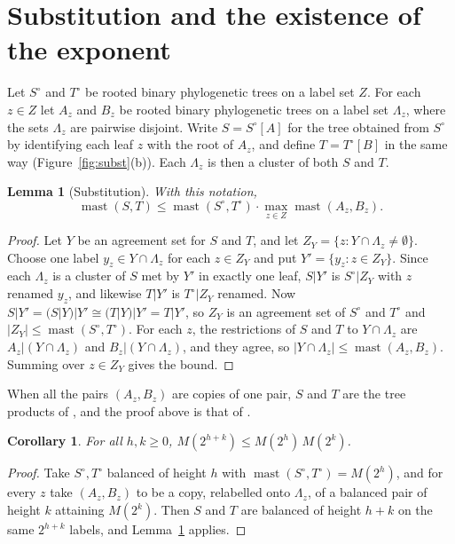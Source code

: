 \documentclass[11pt]{amsart}
\newtheorem{lemma}[theorem]{Lemma}
\newtheorem{corollary}[theorem]{Corollary}
\theoremstyle{definition}
\newcommand{\mast}{\operatorname{mast}}
\begin{document}
\section{Substitution and the existence of the exponent}\label{sec:subst}

Let $S^\circ$ and $T^\circ$ be rooted binary phylogenetic trees on a label set $Z$. For each
$z\in Z$ let $A_z$ and $B_z$ be rooted binary phylogenetic trees on a label set $\Lambda_z$,
where the sets $\Lambda_z$ are pairwise disjoint. Write $S=S^\circ[A]$ for the tree obtained from
$S^\circ$ by identifying each leaf $z$ with the root of $A_z$, and define $T=T^\circ[B]$ in the
same way (Figure~\ref{fig:subst}(b)). Each $\Lambda_z$ is then a cluster of both $S$ and $T$.

\begin{lemma}[Substitution]\label{lem:subst}
With this notation,
\[
\mast(S,T)\le \mast(S^\circ,T^\circ)\cdot\max_{z\in Z}\mast(A_z,B_z).
\]
\end{lemma}

\begin{proof}
Let $Y$ be an agreement set for $S$ and $T$, and let $Z_Y=\{z: Y\cap\Lambda_z\ne\emptyset\}$.
Choose one label $y_z\in Y\cap\Lambda_z$ for each $z\in Z_Y$ and put $Y'=\{y_z:z\in Z_Y\}$.
Since each $\Lambda_z$ is a cluster of $S$ met by $Y'$ in exactly one leaf, $S|Y'$ is
$S^\circ|Z_Y$ with $z$ renamed $y_z$, and likewise $T|Y'$ is $T^\circ|Z_Y$ renamed. Now
$S|Y'=(S|Y)|Y'\cong(T|Y)|Y'=T|Y'$, so $Z_Y$ is an agreement set of $S^\circ$ and $T^\circ$ and
$|Z_Y|\le\mast(S^\circ,T^\circ)$. For each $z$, the restrictions of $S$ and $T$ to
$Y\cap\Lambda_z$ are $A_z|(Y\cap\Lambda_z)$ and $B_z|(Y\cap\Lambda_z)$, and they agree, so
$|Y\cap\Lambda_z|\le\mast(A_z,B_z)$. Summing over $z\in Z_Y$ gives the bound.
\end{proof}

When all the pairs $(A_z,B_z)$ are copies of one pair, $S$ and $T$ are the tree products of
\cite[Definition~36]{GNBP}, and the proof above is that of \cite[Lemma~39]{GNBP}.

\begin{corollary}\label{cor:submult}
For all $h,k\ge0$, $M(2^{h+k})\le M(2^h)\,M(2^k)$.
\end{corollary}

\begin{proof}
Take $S^\circ,T^\circ$ balanced of height $h$ with $\mast(S^\circ,T^\circ)=M(2^h)$, and for every
$z$ take $(A_z,B_z)$ to be a copy, relabelled onto $\Lambda_z$, of a balanced pair of height $k$
attaining $M(2^k)$. Then $S$ and $T$ are balanced of height $h+k$ on the same $2^{h+k}$
labels, and Lemma~\ref{lem:subst} applies.
\end{proof}
\end{document}
